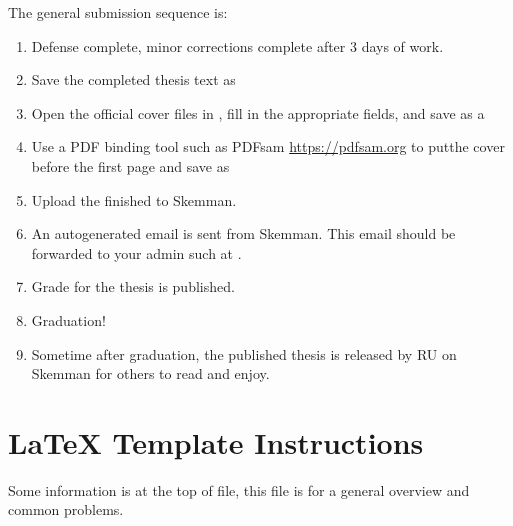 The general submission sequence is:
\begin{enumerate}
\item Defense complete, minor corrections complete after 3 days of work.
\item Save the completed thesis text as 
\item Open the official cover files in , fill in the appropriate fields, and save as a 
  \item Use a PDF binding tool such as PDFsam \url{https://pdfsam.org} to putthe cover before the first page and save as  
\item Upload the finished  to Skemman.
\item An autogenerated email is sent from Skemman.
  This email should be forwarded to your admin such at \TItvdadmin{}.
\item Grade for the thesis is published.
\item Graduation!
\item Sometime after graduation, the published thesis is released by RU on Skemman for others to read and enjoy.
\end{enumerate}

\section{LaTeX Template Instructions}
Some information is at the top of  file, this file is for a general overview and common problems.

